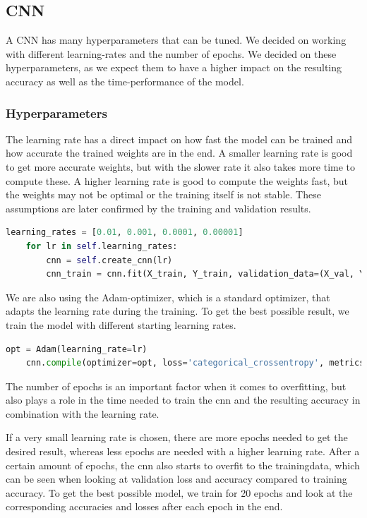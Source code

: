 \documentclass[12pt,a4paper]{scrartcl}		%
\begin{document}
    \subsection{CNN}
        A CNN has many hyperparameters that can be tuned. We decided on working with different learning-rates and the number of epochs. We decided 
        on these hyperparameters, as we expect them to have a higher impact on the resulting accuracy as well as the time-performance of the model.
        \subsubsection{Hyperparameters}
            The learning rate has a direct impact on how fast the model can be trained and how accurate the trained weights are in the end.
            A smaller learning rate is good to get more accurate weights, but with the slower rate it also takes more time to compute these.
            A higher learning rate is good to compute the weights fast, but the weights may not be optimal or the training itself is not stable.
            These assumptions are later confirmed by the training and validation results.

\begin{lstlisting}[language=Python]
    learning_rates = [0.01, 0.001, 0.0001, 0.00001]
    for lr in self.learning_rates:
        cnn = self.create_cnn(lr)
        cnn_train = cnn.fit(X_train, Y_train, validation_data=(X_val, Y_val), epochs = 15, verbose=0)
\end{lstlisting}

            We are also using the Adam-optimizer, which is a standard optimizer, that adapts the learning rate during the training. To get the best possible 
            result, we train the model with different starting learning rates.

\begin{lstlisting}[language=Python]
    opt = Adam(learning_rate=lr)
    cnn.compile(optimizer=opt, loss='categorical_crossentropy', metrics=['accuracy'])
\end{lstlisting}

            The number of epochs is an important factor when it comes to overfitting, but also plays a role in the time needed to train the cnn and the 
            resulting accuracy in combination with the learning rate.

            If a very small learning rate is chosen, there are more epochs needed to get the desired result, whereas less epochs are needed with 
            a higher learning rate.
            After a certain amount of epochs, the cnn also starts to overfit to the trainingdata, which can be seen when looking at validation loss and accuracy 
            compared to training accuracy.
            To get the best possible model, we train for 20 epochs and look at the corresponding accuracies and losses after each epoch in the end.
\end{document}
